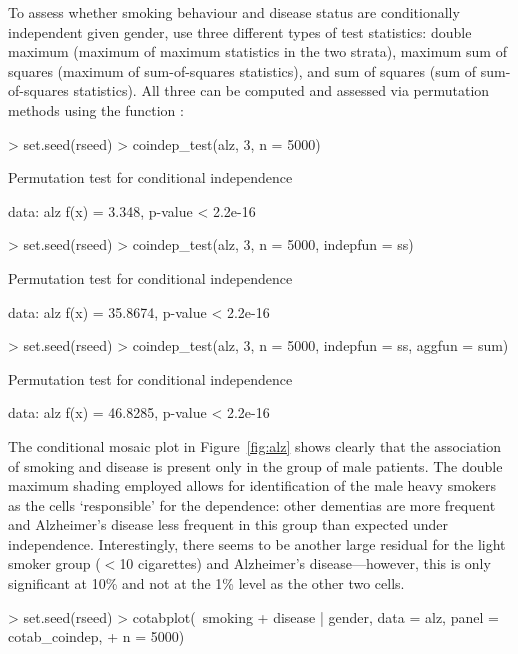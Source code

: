\documentclass{Z}
\begin{document}
To assess whether smoking behaviour and disease status are conditionally independent
given gender, \cite{vcd:Zeileis+Meyer+Hornik:2005} use three different types of test
statistics: double maximum (maximum of maximum statistics in the two strata), 
maximum sum of squares (maximum of sum-of-squares statistics), and sum of squares
(sum of sum-of-squares statistics). All three can be computed and assessed via
permutation methods using the function :

\begin{Schunk}
\begin{Sinput}
> set.seed(rseed)
> coindep_test(alz, 3, n = 5000)
\end{Sinput}
\begin{Soutput}
	Permutation test for conditional independence

data:  alz 
f(x) = 3.348, p-value < 2.2e-16
\end{Soutput}
\begin{Sinput}
> set.seed(rseed)
> coindep_test(alz, 3, n = 5000, indepfun = ss)
\end{Sinput}
\begin{Soutput}
	Permutation test for conditional independence

data:  alz 
f(x) = 35.8674, p-value < 2.2e-16
\end{Soutput}
\begin{Sinput}
> set.seed(rseed)
> coindep_test(alz, 3, n = 5000, indepfun = ss, aggfun = sum)
\end{Sinput}
\begin{Soutput}
	Permutation test for conditional independence

data:  alz 
f(x) = 46.8285, p-value < 2.2e-16
\end{Soutput}
\end{Schunk}

The conditional mosaic plot in Figure~\ref{fig:alz}
shows clearly that the association of smoking and disease is present only in
the group of male patients. The double maximum shading employed allows for
identification of the male heavy smokers as the cells `responsible' for the dependence:
other dementias are more frequent and Alzheimer's disease less frequent in this group than expected
under independence. Interestingly, there seems to be another large residual for
the light smoker group ($<$10 cigarettes) and Alzheimer's disease---however, this
is only significant at 10\% and not at the 1\% level as the other two cells.

\begin{Schunk}
\begin{Sinput}
> set.seed(rseed)
> cotabplot(~smoking + disease | gender, data = alz, panel = cotab_coindep, 
+     n = 5000)
\end{Sinput}
\end{Schunk}
\end{document}
